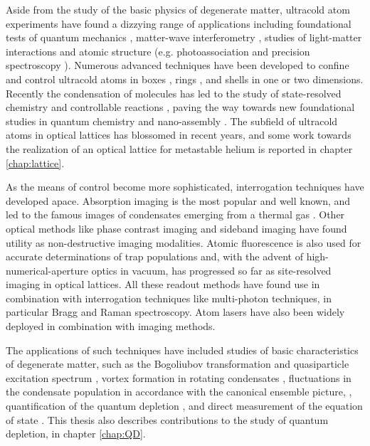 	Aside from the study of the basic physics of degenerate matter, ultracold atom experiments have found a dizzying range of applications including foundational tests of quantum mechanics \cite{Lopes15,Manning15},	matter-wave interferometry \cite{Cronin09},	studies of light-matter interactions and atomic structure (e.g. photoassociation\cite{Jones06} and precision spectroscopy \cite{Campbell17,Marti18}). Numerous advanced techniques have been developed to confine and control ultracold atoms in boxes \cite{Meyrath05}, rings \cite{Gupta05}, and shells \cite{Gaunt13} in one \cite{Kinoshita04} or two \cite{Rychatrik04} dimensions. 
	Recently the condensation of molecules \cite{Zwirlein03} has led to the study of state-resolved chemistry and controllable reactions \cite{Balakrishnan16}, paving the way towards new foundational studies in quantum chemistry and nano-assembly \cite{Reynolds20}. 
	The subfield of ultracold atoms in optical lattices \cite{LewensteinLattices,Bloch05,Bloch08,Bloch12,Gross17} has blossomed in recent years, and some work towards the realization of an optical lattice for metastable helium is reported in chapter \ref{chap:lattice}.
	
	As the means of control become more sophisticated, interrogation techniques have developed apace. Absorption imaging is the most popular and well known, and led to the famous images of condensates emerging from a thermal gas \cite{Nobel01Note}. Other optical methods like phase contrast imaging \cite{MakingProbingUnderstanding} and sideband imaging \cite{Lye99} have found utility as non-destructive imaging modalities. Atomic fluorescence is also used for accurate determinations of trap populations \cite{VassenReview} and, with the advent of high-numerical-aperture optics in vacuum, has progressed so far as site-resolved imaging in optical lattices. 
	All these readout methods have found use in combination with interrogation techniques like multi-photon techniques, in particular Bragg  \cite{Stenger99} and Raman \cite{Hagley99,Cola04} spectroscopy. Atom lasers \cite{Mewes97,Bloch99} have also been widely deployed in combination with imaging methods.
	
	The applications of such techniques have included studies of basic characteristics of degenerate matter, such as the Bogoliubov transformation and quasiparticle excitation spectrum  \cite{Steinhauer02,Vogels02}, vortex formation in rotating condensates \cite{Madison00}, fluctuations in the condensate population in accordance with the canonical ensemble picture, \cite{Kristensen19}, quantification of the quantum depletion \cite{Xu06,Lopes17_depletion}, and direct measurement of the equation of state \cite{Mordini20}. 
	This thesis also describes contributions to the study of quantum depletion, in chapter \ref{chap:QD}.

